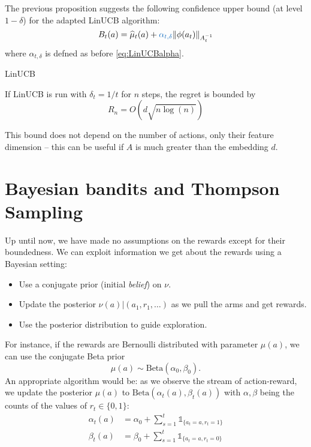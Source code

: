 \documentclass[../course-notes.tex]{subfiles}
\begin{document}
The previous proposition suggests the following confidence upper bound (at level $1-\delta$) for the adapted LinUCB algorithm:
\begin{equation}\label{eq:LinUCBconfupperbound}
	B_t(a) = \widehat{\mu}_t(a) + {\bluefont\alpha_{t,\delta}}\|\phi(a_t)\|_{A_t^{-1}}
\end{equation}
where $\alpha_{t,\delta}$ is defned as before \eqref{eq:LinUCBalpha}.

\begin{algorithm}\caption{LinUCB}
\end{algorithm}

\begin{prop}
If LinUCB is run with $\delta_t=1/t$ for $n$ steps, the regret is bounded by
\[
	R_n = O(d\sqrt{n\log(n)})
\]
\end{prop}

This bound does not depend on the number of actions, only their feature dimension -- this can be useful if $A$ is much greater than the embedding $d$.



\section{Bayesian bandits and Thompson Sampling}

Up until now, we have made no assumptions on the rewards except for their boundedness.
We can exploit information we get about the rewards using a Bayesian setting:
\begin{itemize}
	\item Use a conjugate prior (initial \textit{belief}) on $\nu$.
	\item Update the posterior $\nu(a) | (a_1, r_1,\ldots)$ as we pull the arms and get rewards.
	\item Use the posterior distribution to guide exploration.
\end{itemize}

For instance, if the rewards are Bernoulli distributed with parameter $\mu(a)$, we can use the conjugate Beta prior
\[
	\mu(a) \sim \mathrm{Beta}(\alpha_0, \beta_0).
\]
An appropriate algorithm would be: as we observe the stream of action-reward, we update the posterior $\mu(a)$ to $\mathrm{Beta}(\alpha_t(a), \beta_t(a))$ with $\alpha, \beta$ being the counts of the values of $r_t \in \{0,1\}$:
\begin{subequations}
\begin{align}
	\alpha_t(a) &= \alpha_0
	+ \sum_{s=1}^t \mathds{1}_{\{a_t=a, r_t=1 \}}  \\
	\beta_t(a) &= \beta_0
	+ \sum_{s=1}^t \mathds{1}_{\{a_t=a, r_t=0 \}}
\end{align}
\end{subequations}
\end{document}
